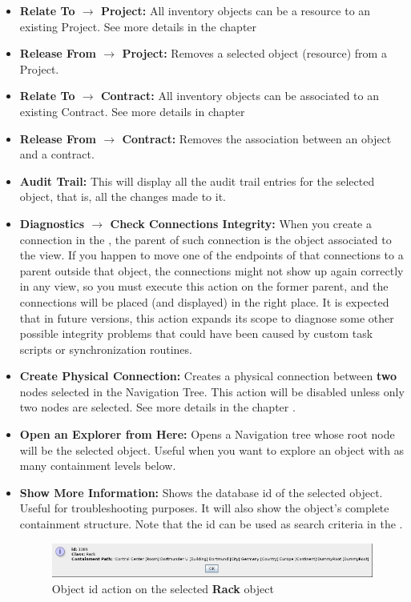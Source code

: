 \documentclass[a4paper]{article}
\begin{document}
\begin{itemize}
		\item \textbf{Relate To $\rightarrow$ Project:} All inventory objects can be a resource to an existing Project. See more details in the chapter \textbf{}
		\item \textbf{Release From $\rightarrow$ Project:} Removes a selected object (resource) from a Project.
		\item \textbf{Relate To $\rightarrow$ Contract:} All inventory objects can be associated to an existing Contract. See more details in chapter \textbf{}
		\item \textbf{Release From $\rightarrow$ Contract:} Removes the association between an object and a contract.
		\item \textbf{Audit Trail:} This will display all the audit trail entries for the selected object, that is, all the changes made to it.
		\item \textbf{Diagnostics $\rightarrow$ Check Connections Integrity: } When you create a connection in the , the parent of such connection is the object associated to the view. If you happen to move one of the endpoints of that connections to a parent outside that object, the connections might not show up again correctly in any view, so you must execute this action on the former parent, and the connections will be placed (and displayed) in the right place. It is expected that in future versions, this action expands its scope to diagnose some other possible integrity problems that could have been caused by custom task scripts or synchronization routines.
		\item \textbf{Create Physical Connection:} Creates a physical connection between \textbf{two} nodes selected in the Navigation Tree. This action will be disabled unless only two nodes are selected. See more details in the chapter \textbf{}.
		\item \textbf{Open an Explorer from Here:} Opens a Navigation tree whose root node will be the selected object. Useful when you want to explore an object with as many containment levels below.
		\item \textbf{Show More Information:} Shows the database id of the selected object. Useful for troubleshooting purposes. It will also show the object's complete containment structure. Note that the id can be used as search criteria in the \textbf{}.
		\pagebreak
			\begin{figure}[h!]
				\centering
				\includegraphics[width=\linewidth]{img/action_show_object_id.png}
				\caption{Object id action on the selected \textbf{Rack} object}
				\label{fig:action_show_object_id}
			\end{figure}
	\end{itemize}
\end{document}
